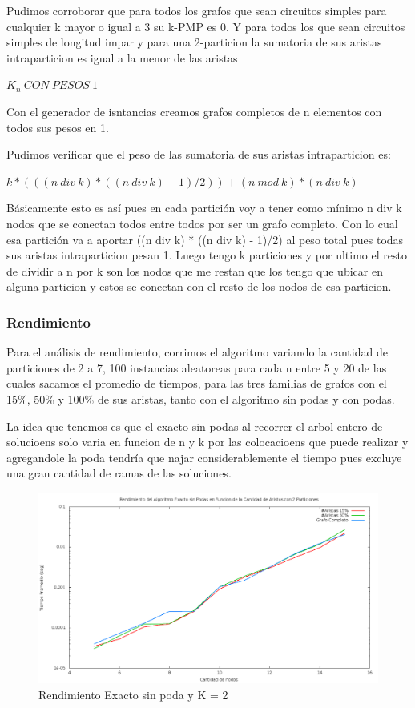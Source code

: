 Pudimos corroborar que para todos los grafos que sean circuitos simples para cualquier k mayor o igual a 3 su k-PMP es 0. Y para todos los que sean circuitos simples de longitud impar y para una 2-particion la sumatoria de sus aristas intraparticion es igual a la menor de las aristas

$ K_n\ CON\ PESOS\ 1$

Con el generador de isntancias creamos grafos completos de n elementos con todos sus pesos en 1.

Pudimos verificar que el peso de las sumatoria de sus aristas intraparticion es:

\bc
	$k * (((n\  div\  k) * ((n\  div\  k) - 1)/2)) + (n\  mod\  k) * (n\  div\  k)$
\ec

B\'asicamente esto es as\'i pues en cada partici\'on voy a tener como m\'inimo n div k nodos que se conectan todos entre todos por ser un grafo completo. Con lo cual esa partici\'on va a aportar ((n div k) * ((n div k) - 1)/2) al peso total pues todas sus aristas intraparticion pesan 1. Luego tengo k particiones y por ultimo el resto de dividir a n por k son los nodos que me restan que los tengo que ubicar en alguna particion y estos se conectan con el resto de los nodos de esa particion.


\subsubsection{Rendimiento}

Para el análisis de rendimiento, corrimos el algoritmo variando la cantidad de particiones de 2 a 7, 100 instancias aleatoreas para cada n entre 5 y 20 de las cuales sacamos el promedio de tiempos, para las tres familias de grafos con el 15\%, 50\% y 100\% de sus aristas, tanto con el algoritmo sin podas y con podas.

La idea que tenemos es que el exacto sin podas al recorrer el arbol entero de solucioens solo varia en funcion de n y k por las colocacioens que puede realizar y agregandole la poda tendr\'ia que najar considerablemente el tiempo pues excluye una gran cantidad de ramas de las soluciones. 

\begin{figure}[H]
\begin{center}
\includegraphics[scale=0.3]{finales/rendimientoExactoSinPoda2Particiones.png}
\caption{Rendimiento Exacto sin poda y K = 2}
\end{center}
\end{figure}


